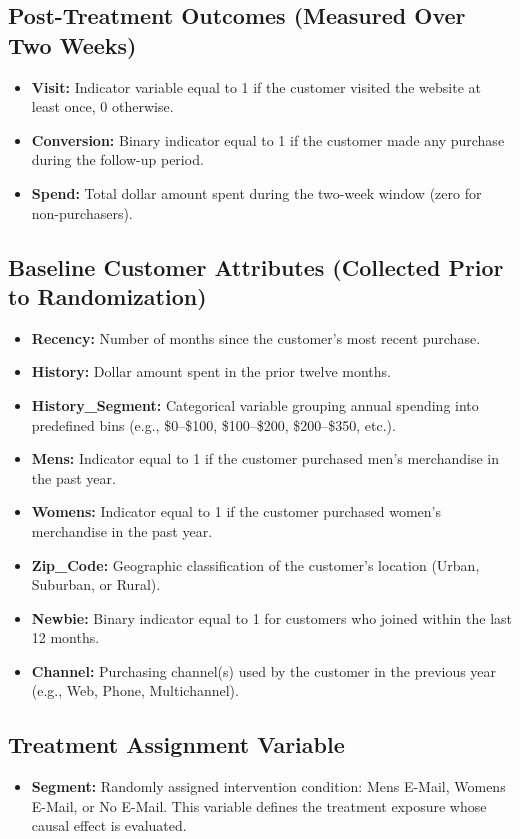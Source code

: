 \documentclass[10pt]{article}
\begin{document}
\subsection*{Post-Treatment Outcomes (Measured Over Two Weeks)}
\begin{itemize}
    \item \textbf{Visit:} Indicator variable equal to 1 if the customer visited the website at least once, 0 otherwise.
    \item \textbf{Conversion:} Binary indicator equal to 1 if the customer made any purchase during the follow-up period.
    \item \textbf{Spend:} Total dollar amount spent during the two-week window (zero for non-purchasers).
\end{itemize}

\subsection*{Baseline Customer Attributes (Collected Prior to Randomization)}
\begin{itemize}
    \item \textbf{Recency:} Number of months since the customer’s most recent purchase.
    \item \textbf{History:} Dollar amount spent in the prior twelve months.
    \item \textbf{History\_Segment:} Categorical variable grouping annual spending into predefined bins (e.g., \$0--\$100, \$100--\$200, \$200--\$350, etc.).
    \item \textbf{Mens:} Indicator equal to 1 if the customer purchased men's merchandise in the past year.
    \item \textbf{Womens:} Indicator equal to 1 if the customer purchased women's merchandise in the past year.
    \item \textbf{Zip\_Code:} Geographic classification of the customer's location (Urban, Suburban, or Rural).
    \item \textbf{Newbie:} Binary indicator equal to 1 for customers who joined within the last 12 months.
    \item \textbf{Channel:} Purchasing channel(s) used by the customer in the previous year (e.g., Web, Phone, Multichannel).
\end{itemize}

\subsection*{Treatment Assignment Variable}
\begin{itemize}
    \item \textbf{Segment:} Randomly assigned intervention condition: Mens E-Mail, Womens E-Mail, or No E-Mail. This variable defines the treatment exposure whose causal effect is evaluated.
\end{itemize}
\end{document}
